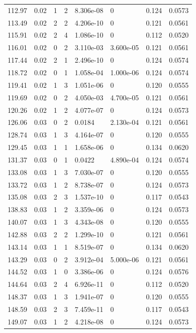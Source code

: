 \documentclass[preview]{standalone}
\begin{document}
{{{\begin{tabular}{L{1.2cm}C{1.2cm} C{0.3cm}C{0.5cm} C{1.4cm}C{1.4cm} C{1.4cm}C{1.4cm}}
  112.97  &  0.02  & 1     &  2 &  8.306e-08  & 0  & 0.124 &  0.0573   \\ 
  113.49  &  0.02  & 2     &  2 &  4.206e-10  & 0  & 0.121 &  0.0561   \\ 
  115.91  &  0.02  & 2     &  4 &  1.086e-10  & 0  & 0.112 &  0.0520   \\ 
  116.01  &  0.02  & 0     &  2 &  3.110e-03  & 3.600e-05  & 0.121 &  0.0561   \\ 
  117.44  &  0.02  & 2     &  1 &  2.496e-10  & 0  & 0.124 &  0.0574   \\ 
  118.72  &  0.02  & 0     &  1 &  1.058e-04  & 1.000e-06  & 0.124 &  0.0574   \\ 
  119.41  &  0.02  & 1     &  3 &  1.051e-06  & 0  & 0.120 &  0.0555   \\ 
  119.69  &  0.02  & 0     &  2 &  4.050e-03  & 4.700e-05  & 0.121 &  0.0561   \\ 
  120.26  &  0.02  & 1     &  2 &  4.077e-07  & 0  & 0.124 &  0.0573   \\ 
  126.06  &  0.03  & 0     &  2 &  0.0184  & 2.130e-04  & 0.121 &  0.0561   \\ 
  128.74  &  0.03  & 1     &  3 &  4.164e-07  & 0  & 0.120 &  0.0555   \\ 
  129.45  &  0.03  & 1     &  1 &  1.658e-06  & 0  & 0.134 &  0.0620   \\ 
  131.37  &  0.03  & 0     &  1 &  0.0422  & 4.890e-04  & 0.124 &  0.0574   \\ 
  133.08  &  0.03  & 1     &  3 &  7.030e-07  & 0  & 0.120 &  0.0555   \\ 
  133.72  &  0.03  & 1     &  2 &  8.738e-07  & 0  & 0.124 &  0.0573   \\ 
  135.08  &  0.03  & 2     &  3 &  1.537e-10  & 0  & 0.117 &  0.0543   \\ 
  138.83  &  0.03  & 1     &  2 &  3.359e-06  & 0  & 0.124 &  0.0573   \\ 
  140.07  &  0.03  & 1     &  3 &  4.343e-08  & 0  & 0.120 &  0.0555   \\ 
  142.88  &  0.03  & 2     &  2 &  1.299e-10  & 0  & 0.121 &  0.0561   \\ 
  143.14  &  0.03  & 1     &  1 &  8.519e-07  & 0  & 0.134 &  0.0620   \\ 
  143.29  &  0.03  & 0     &  2 &  3.912e-04  & 5.000e-06  & 0.121 &  0.0561   \\ 
  144.52  &  0.03  & 1     &  0 &  3.386e-06  & 0  & 0.124 &  0.0576   \\ 
  144.64  &  0.03  & 2     &  4 &  6.926e-11  & 0  & 0.112 &  0.0520   \\ 
  148.37  &  0.03  & 1     &  3 &  1.941e-07  & 0  & 0.120 &  0.0555   \\ 
  148.59  &  0.03  & 2     &  3 &  7.459e-11  & 0  & 0.117 &  0.0543   \\ 
  149.07  &  0.03  & 1     &  2 &  4.218e-08  & 0  & 0.124 &  0.0573   \\ 
\hline 
\end{tabular} 

}}}
\end{document}
